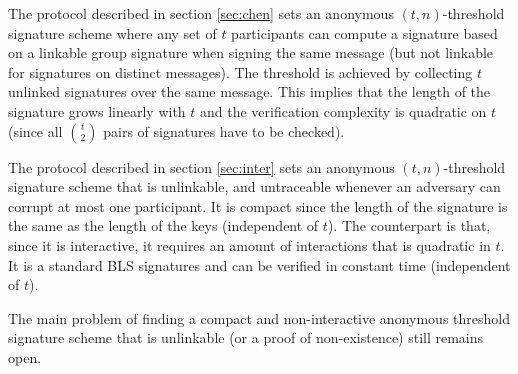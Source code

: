 The protocol described in section \ref{sec:chen} sets an anonymous $(t,n)$-threshold signature scheme where any set of $t$ participants can compute a signature based on a linkable group signature when signing the same message (but not linkable for signatures on distinct messages). The threshold is achieved by collecting $t$ unlinked signatures over the same message. This implies that the length of the signature grows linearly with $t$ and the verification complexity is quadratic on $t$ (since all $\binom{t}{2}$ pairs of signatures have to be checked).

The protocol described in section \ref{sec:inter} sets an anonymous $(t,n)$-threshold signature scheme that is unlinkable, and untraceable whenever an adversary can corrupt at most one participant. It is compact since the length of the signature is the same as the length of the keys (independent of $t$). The counterpart is that, since it is interactive, it requires an amount of interactions that is quadratic in $t$. It is a standard BLS signatures and can be verified in constant time (independent of $t$).

The main problem of finding a compact and non-interactive anonymous threshold signature scheme that is unlinkable (or a proof of non-existence) still remains open.